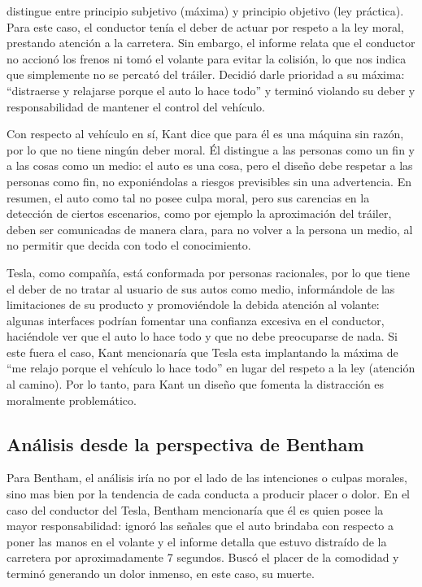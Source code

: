 \citet{kant1785groundwork} distingue entre principio subjetivo (máxima) y principio objetivo (ley práctica). Para este caso, el conductor tenía el deber de actuar por respeto a la ley moral, prestando atención a la carretera. Sin embargo, el informe relata que el conductor no accionó los frenos ni tomó el volante para evitar la colisión, lo que nos indica que simplemente no se percató del tráiler. Decidió darle prioridad a su máxima: “distraerse y relajarse porque el auto lo hace todo” y terminó violando su deber y responsabilidad de mantener el control del vehículo.

\medskip

Con respecto al vehículo en sí, Kant dice que para él es una máquina sin razón, por lo que no tiene ningún deber moral. Él distingue a las personas como un fin y a las cosas como un medio: el auto es una cosa, pero el diseño debe respetar a las personas como fin, no exponiéndolas a riesgos previsibles sin una advertencia. En resumen, el auto como tal no posee culpa moral, pero sus carencias en la detección de ciertos escenarios, como por ejemplo la aproximación del tráiler, deben ser comunicadas de manera clara, para no volver a la persona un medio, al no permitir que decida con todo el conocimiento.

\medskip

Tesla, como compañía, está conformada por personas racionales, por lo que tiene el deber de no tratar al usuario de sus autos como medio, informándole de las limitaciones de su producto y promoviéndole la debida atención al volante: algunas interfaces podrían fomentar una confianza excesiva en el conductor, haciéndole ver que el auto lo hace todo y que no debe preocuparse de nada. Si este fuera el caso, Kant mencionaría que Tesla esta implantando la máxima de “me relajo porque el vehículo lo hace todo” en lugar del respeto a la ley (atención al camino). Por lo tanto, para Kant un diseño que fomenta la distracción es moralmente problemático.

\subsection{Análisis desde la perspectiva de Bentham}

Para Bentham, el análisis iría no por el lado de las intenciones o culpas morales, sino mas bien por la tendencia de cada conducta a producir placer o dolor. En el caso del conductor del Tesla, Bentham mencionaría que él es quien posee la mayor responsabilidad: ignoró las señales que el auto brindaba con respecto a poner las manos en el volante y el informe detalla que estuvo distraído de la carretera por aproximadamente 7 segundos. Buscó el placer de la comodidad y terminó generando un dolor inmenso, en este caso, su muerte.

